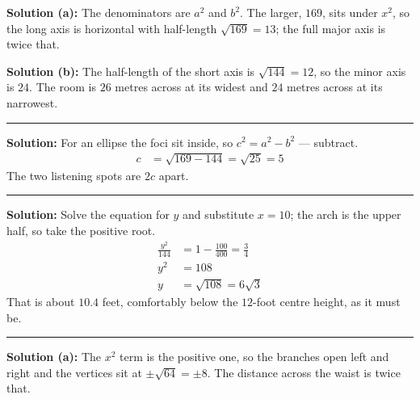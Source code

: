 \documentclass[12pt]{article}
\begin{document}




\textbf{Solution (a):} The denominators are $a^2$ and $b^2$. The larger, $169$, sits under
$x^2$, so the long axis is horizontal with half-length $\sqrt{169} = 13$; the full major axis
is twice that. 

\textbf{Solution (b):} The half-length of the short axis is $\sqrt{144} = 12$, so the minor
axis is $24$. 
The room is $26$ metres across at its widest and $24$ metres across at its narrowest.

\vspace{0.2cm}\noindent\rule{\linewidth}{0.2pt}


\textbf{Solution:} For an ellipse the foci sit inside, so $c^2 = a^2 - b^2$ --- subtract.
\begin{align*}
  c &= \sqrt{169 - 144} = \sqrt{25} = 5
\end{align*}
The two listening spots are $2c$ apart. 

\vspace{0.2cm}\noindent\rule{\linewidth}{0.2pt}


\textbf{Solution:} Solve the equation for $y$ and substitute $x = 10$; the arch is the upper
half, so take the positive root.
\begin{align*}
  \frac{y^2}{144} &= 1 - \frac{100}{400} = \frac{3}{4} \\
  y^2 &= 108 \\
  y &= \sqrt{108} = 6\sqrt{3}
\end{align*}
That is about $10.4$ feet, comfortably below the $12$-foot centre height, as it must be.

\vspace{0.2cm}\noindent\rule{\linewidth}{0.2pt}


\textbf{Solution (a):} The $x^2$ term is the positive one, so the branches open left and
right and the vertices sit at $\pm\sqrt{64} = \pm 8$. The distance across the waist is twice
that. 
\end{document}
